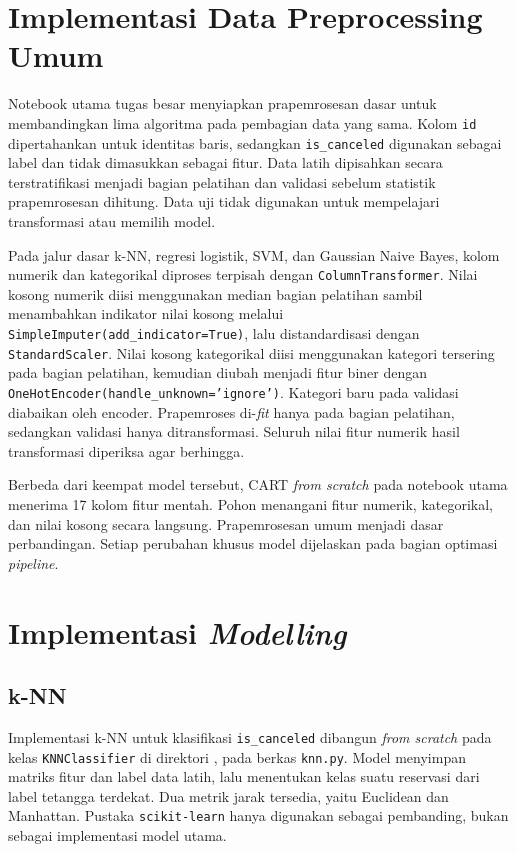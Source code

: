 \section{Implementasi Data Preprocessing Umum}

Notebook utama tugas besar menyiapkan prapemrosesan dasar untuk membandingkan lima algoritma pada pembagian data yang sama. Kolom \texttt{id} dipertahankan untuk identitas baris, sedangkan \texttt{is\_canceled} digunakan sebagai label dan tidak dimasukkan sebagai fitur. Data latih dipisahkan secara terstratifikasi menjadi bagian pelatihan dan validasi sebelum statistik prapemrosesan dihitung. Data uji tidak digunakan untuk mempelajari transformasi atau memilih model.

Pada jalur dasar k-NN, regresi logistik, SVM, dan Gaussian Naive Bayes, kolom numerik dan kategorikal diproses terpisah dengan \texttt{ColumnTransformer}. Nilai kosong numerik diisi menggunakan median bagian pelatihan sambil menambahkan indikator nilai kosong melalui \texttt{SimpleImputer(add\_indicator=True)}, lalu distandardisasi dengan \texttt{StandardScaler}. Nilai kosong kategorikal diisi menggunakan kategori tersering pada bagian pelatihan, kemudian diubah menjadi fitur biner dengan \texttt{OneHotEncoder(handle\_unknown='ignore')}. Kategori baru pada validasi diabaikan oleh encoder. Prapemroses di-\textit{fit} hanya pada bagian pelatihan, sedangkan validasi hanya ditransformasi. Seluruh nilai fitur numerik hasil transformasi diperiksa agar berhingga.

Berbeda dari keempat model tersebut, CART \textit{from scratch} pada notebook utama menerima 17 kolom fitur mentah. Pohon menangani fitur numerik, kategorikal, dan nilai kosong secara langsung. Prapemrosesan umum menjadi dasar perbandingan. Setiap perubahan khusus model dijelaskan pada bagian optimasi \textit{pipeline}.

\section{Implementasi \textit{Modelling}}

\subsection{k-NN}

Implementasi k-NN untuk klasifikasi \texttt{is\_canceled} dibangun \textit{from scratch} pada kelas \texttt{KNNClassifier} di direktori , pada berkas \texttt{knn.py}. Model menyimpan matriks fitur dan label data latih, lalu menentukan kelas suatu reservasi dari label tetangga terdekat. Dua metrik jarak tersedia, yaitu Euclidean dan Manhattan. Pustaka \texttt{scikit-learn} hanya digunakan sebagai pembanding, bukan sebagai implementasi model utama.

